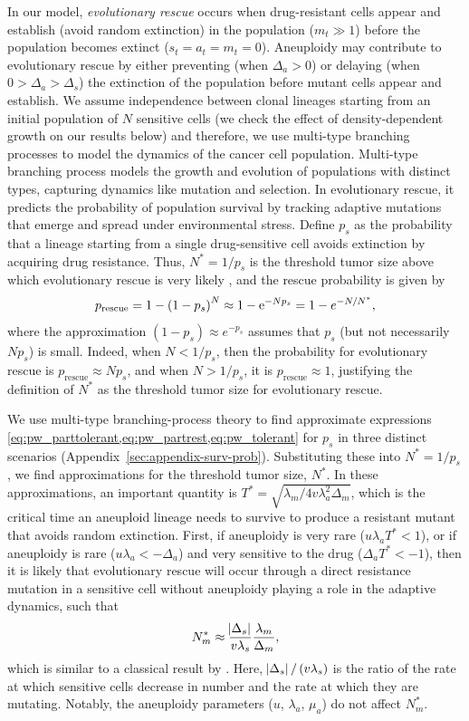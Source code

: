 \documentclass[12pt]{extarticle}
\newcommand{\e}{{\rm e}}
\newcommand{\presc}{p_\text{rescue}}
\begin{document}
In our model, \emph{evolutionary rescue} occurs when drug-resistant cells appear and establish (avoid random extinction) in the population  ($m_t \gg 1$) before the population becomes extinct ($s_t=a_t=m_t=0$). %
Aneuploidy may contribute to evolutionary rescue by either preventing (when $\Delta_a>0$) or delaying (when $0>\Delta_a>\Delta_s$) the extinction of the population before mutant cells appear and establish.
We assume independence between clonal lineages starting from an initial population of $N$ sensitive cells (we check the effect of density-dependent growth on our results below) and therefore, we use multi-type branching processes to model the dynamics of the cancer cell population. Multi-type branching process models the growth and evolution of populations with distinct types, capturing dynamics like mutation and selection. In evolutionary rescue, it predicts the probability of population survival by tracking adaptive mutations that emerge and spread under environmental stress. %
Define $p_s$ as the probability that a lineage starting from a single drug-sensitive cell avoids extinction by acquiring drug resistance.
Thus, $N^*=1/p_s$ is the threshold tumor size above which evolutionary rescue is very likely \citep{iwasa2003evolutionary}, and the rescue probability is given by 
\begin{equation}\label{eq:rescue_prob} 
\presc = 
1-\left(1-p_s\right)^N \approx
1-\e^{-Np_s} = 
1-e^{-N/N^*} ,
\end{equation}
where the approximation $(1-p_s)\approx e^{-p_s}$ assumes that $p_s$ (but not necessarily $N p_s$) is small.
Indeed, when $N<1/p_s$, then the probability for evolutionary rescue is $\presc \approx N p_s$, and when $N > 1/p_s$, it is $\presc \approx 1$, justifying the definition of $N^*$ as the threshold tumor size for evolutionary rescue. 

We use multi-type branching-process theory to find approximate expressions \cref{eq:pw_parttolerant,eq:pw_partrest,eq:pw_tolerant} for $p_s$ in three distinct scenarios (Appendix~\ref{sec:appendix-surv-prob}). 
Substituting these into $N^*=1/p_s$, we find approximations for the threshold tumor size, $N^*$. 
In these approximations, an important quantity is $T^* = \sqrt{\lambda_m / 4 v \lambda_a^2 \Delta_m}$, which is the critical time an aneuploid lineage needs to survive to produce a resistant mutant that avoids random extinction.
First, if aneuploidy is very rare ($u\lambda_a T^*< 1$), or if aneuploidy is rare ($u\lambda_a < -\Delta_a$) and very sensitive to the drug ($\Delta_a T^* < -1$), then it is likely that evolutionary rescue will occur through a direct resistance mutation in a sensitive cell without aneuploidy playing a role in the adaptive dynamics, such that 
\begin{equation} \label{eq:N_m}
N_m^* \approx \frac{\abs{\Delta_s}}{v\lambda_s}  \frac{\lambda_m}{\Delta_m} ,
\end{equation}
which is similar to a classical result by \citet{orr2008population}. %
Here, $\abs{\Delta_s}/\left(v\lambda_s\right)$ is the ratio of the rate at which sensitive cells decrease in number and the rate at which they are mutating. Notably, the aneuploidy parameters ($u$, $\lambda_a$, $\mu_a$) do not affect $N_m^*$. 
\end{document}
